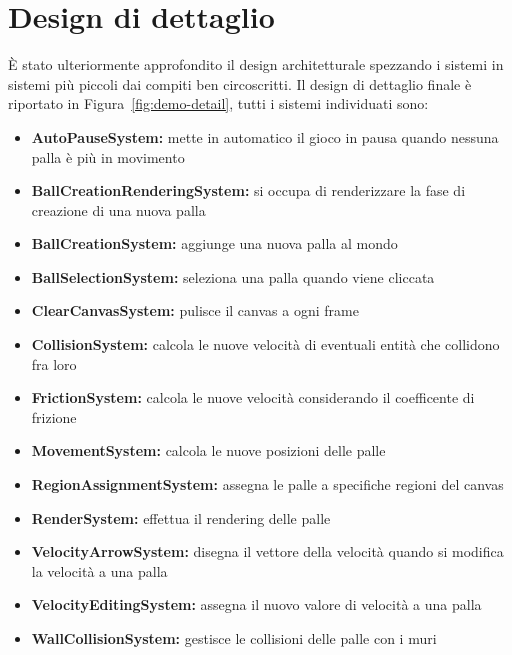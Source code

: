 \section{Design di dettaglio}\label{sec:demo-design-di-dettaglio}
È stato ulteriormente approfondito il design architetturale spezzando i sistemi in sistemi più piccoli
dai compiti ben circoscritti.
Il design di dettaglio finale è riportato in Figura~\ref{fig:demo-detail},
tutti i sistemi individuati sono:
\begin{itemize}
    \item \textbf{AutoPauseSystem:} mette in automatico il gioco in pausa quando nessuna palla è più in movimento
    \item \textbf{BallCreationRenderingSystem:} si occupa di renderizzare la fase di creazione di una nuova palla
    \item \textbf{BallCreationSystem:} aggiunge una nuova palla al mondo
    \item \textbf{BallSelectionSystem:} seleziona una palla quando viene cliccata
    \item \textbf{ClearCanvasSystem:} pulisce il canvas a ogni frame
    \item \textbf{CollisionSystem:} calcola le nuove velocità di eventuali entità che collidono fra loro
    \item \textbf{FrictionSystem:} calcola le nuove velocità considerando il coefficente di frizione
    \item \textbf{MovementSystem:} calcola le nuove posizioni delle palle
    \item \textbf{RegionAssignmentSystem:} assegna le palle a specifiche regioni del canvas
    \item \textbf{RenderSystem:} effettua il rendering delle palle
    \item \textbf{VelocityArrowSystem:} disegna il vettore della velocità quando si modifica la velocità a una palla
    \item \textbf{VelocityEditingSystem:} assegna il nuovo valore di velocità a una palla
    \item \textbf{WallCollisionSystem:} gestisce le collisioni delle palle con i muri
\end{itemize}

